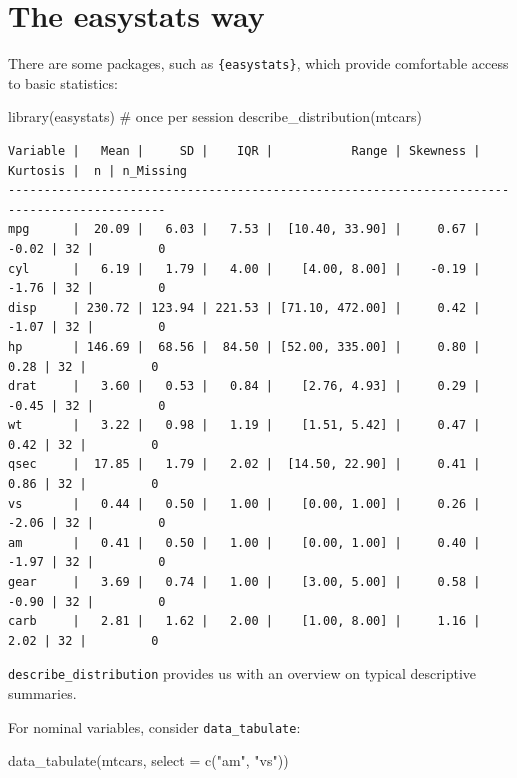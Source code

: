 \documentclass[
  letterpaper,
  DIV=11,
  numbers=noendperiod]{scrreprt}
\newenvironment{Shaded}{\begin{snugshade}}{\end{snugshade}}
\newcommand{\AttributeTok}[1]{\textcolor[rgb]{0.40,0.45,0.13}{#1}}
\newcommand{\CommentTok}[1]{\textcolor[rgb]{0.37,0.37,0.37}{#1}}
\newcommand{\FunctionTok}[1]{\textcolor[rgb]{0.28,0.35,0.67}{#1}}
\newcommand{\NormalTok}[1]{\textcolor[rgb]{0.00,0.23,0.31}{#1}}
\newcommand{\StringTok}[1]{\textcolor[rgb]{0.13,0.47,0.30}{#1}}
\theoremstyle{definition}
\theoremstyle{definition}
\theoremstyle{remark}
\begin{document}
\hypertarget{the-easystats-way}{%
\section{The easystats way}\label{the-easystats-way}}

There are some packages, such as \texttt{\{easystats\}}, which provide
comfortable access to basic statistics:

\begin{Shaded}
\begin{Highlighting}[]
\FunctionTok{library}\NormalTok{(easystats)  }\CommentTok{\# once per session}
\FunctionTok{describe\_distribution}\NormalTok{(mtcars)}
\end{Highlighting}
\end{Shaded}

\begin{verbatim}
Variable |   Mean |     SD |    IQR |           Range | Skewness | Kurtosis |  n | n_Missing
--------------------------------------------------------------------------------------------
mpg      |  20.09 |   6.03 |   7.53 |  [10.40, 33.90] |     0.67 |    -0.02 | 32 |         0
cyl      |   6.19 |   1.79 |   4.00 |    [4.00, 8.00] |    -0.19 |    -1.76 | 32 |         0
disp     | 230.72 | 123.94 | 221.53 | [71.10, 472.00] |     0.42 |    -1.07 | 32 |         0
hp       | 146.69 |  68.56 |  84.50 | [52.00, 335.00] |     0.80 |     0.28 | 32 |         0
drat     |   3.60 |   0.53 |   0.84 |    [2.76, 4.93] |     0.29 |    -0.45 | 32 |         0
wt       |   3.22 |   0.98 |   1.19 |    [1.51, 5.42] |     0.47 |     0.42 | 32 |         0
qsec     |  17.85 |   1.79 |   2.02 |  [14.50, 22.90] |     0.41 |     0.86 | 32 |         0
vs       |   0.44 |   0.50 |   1.00 |    [0.00, 1.00] |     0.26 |    -2.06 | 32 |         0
am       |   0.41 |   0.50 |   1.00 |    [0.00, 1.00] |     0.40 |    -1.97 | 32 |         0
gear     |   3.69 |   0.74 |   1.00 |    [3.00, 5.00] |     0.58 |    -0.90 | 32 |         0
carb     |   2.81 |   1.62 |   2.00 |    [1.00, 8.00] |     1.16 |     2.02 | 32 |         0
\end{verbatim}

\texttt{describe\_distribution} provides us with an overview on typical
descriptive summaries.

For nominal variables, consider \texttt{data\_tabulate}:

\begin{Shaded}
\begin{Highlighting}[]
\FunctionTok{data\_tabulate}\NormalTok{(mtcars, }\AttributeTok{select =} \FunctionTok{c}\NormalTok{(}\StringTok{"am"}\NormalTok{, }\StringTok{"vs"}\NormalTok{))}
\end{Highlighting}
\end{Shaded}
\end{document}
